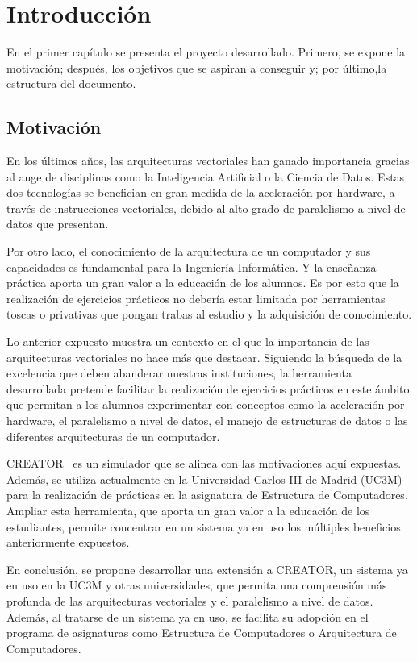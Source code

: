 \chapter{Introducción}\label{chap:introduction}
En el primer capítulo se presenta el proyecto desarrollado. Primero, se expone la motivación; después, los objetivos que se aspiran a conseguir y; por último,la estructura del documento.
\section{Motivación}\label{sec:motivation}

En los últimos años, las arquitecturas vectoriales han ganado importancia gracias al auge de disciplinas como la Inteligencia Artificial o la Ciencia de Datos. Estas dos tecnologías se benefician en gran medida de la aceleración por hardware, a través de instrucciones vectoriales, debido al alto grado de paralelismo a nivel de datos que presentan.

Por otro lado, el conocimiento de la arquitectura de un computador y sus capacidades es fundamental para la Ingeniería Informática. Y la enseñanza práctica aporta un gran valor a la educación de los alumnos. Es por esto que la realización de ejercicios prácticos no debería estar limitada por herramientas toscas o privativas que pongan trabas al estudio y la adquisición de conocimiento. 

Lo anterior expuesto muestra un contexto en el que la importancia de las arquitecturas vectoriales no hace más que destacar. Siguiendo la búsqueda de la excelencia que deben abanderar nuestras instituciones, la herramienta desarrollada pretende facilitar la realización de ejercicios prácticos en este ámbito que permitan a los alumnos experimentar con conceptos como la aceleración por hardware, el paralelismo a nivel de datos, el manejo de estructuras de datos o las diferentes arquitecturas de un computador.

CREATOR~\cite{camarmas2024creator} es un simulador que se alinea con las motivaciones aquí expuestas. Además, se utiliza actualmente en la Universidad Carlos III de Madrid (UC3M) para la realización de prácticas en la asignatura de Estructura de Computadores. Ampliar esta herramienta, que aporta un gran valor a la educación de los estudiantes, permite concentrar en un sistema ya en uso los múltiples beneficios anteriormente expuestos.

    En conclusión, se propone desarrollar una extensión a CREATOR, un sistema ya en uso en la UC3M y otras universidades, que permita una comprensión más profunda de las arquitecturas vectoriales y el paralelismo a nivel de datos. Además, al tratarse de un sistema ya en uso, se facilita su adopción en el programa de asignaturas como Estructura de Computadores o Arquitectura de Computadores.


